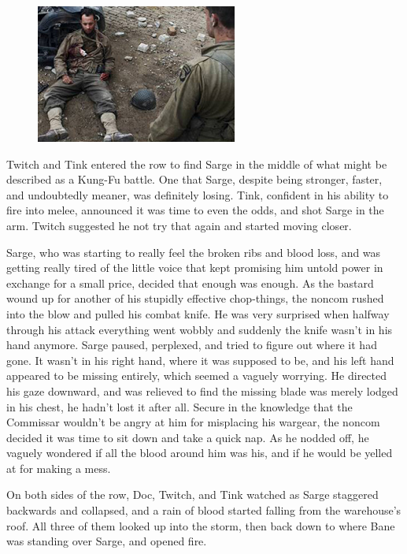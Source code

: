 \begin{figure}
	\begin{center}
		\includegraphics[width=\figwidth]{pics/19/54.png}
	\end{center}
\end{figure}
Twitch and Tink entered the row to find Sarge in the middle of what might be described as a Kung-Fu battle. 
One that Sarge, despite being stronger, faster, and undoubtedly meaner, was definitely losing. 
Tink, confident in his ability to fire into melee, announced it was time to even the odds, and shot Sarge in the arm. 
Twitch suggested he not try that again and started moving closer.

Sarge, who was starting to really feel the broken ribs and blood loss, and was getting really tired of the little voice that kept promising him untold power in exchange for a small price, decided that enough was enough. 
As the bastard wound up for another of his stupidly effective chop-things, the noncom rushed into the blow and pulled his combat knife. 
He was very surprised when halfway through his attack everything went wobbly and suddenly the knife wasn't in his hand anymore. 
Sarge paused, perplexed, and tried to figure out where it had gone. 
It wasn't in his right hand, where it was supposed to be, and his left hand appeared to be missing entirely, which seemed a vaguely worrying. 
He directed his gaze downward, and was relieved to find the missing blade was merely lodged in his chest, he hadn't lost it after all. 
Secure in the knowledge that the Commissar wouldn't be angry at him for misplacing his wargear, the noncom decided it was time to sit down and take a quick nap. 
As he nodded off, he vaguely wondered if all the blood around him was his, and if he would be yelled at for making a mess.

On both sides of the row, Doc, Twitch, and Tink watched as Sarge staggered backwards and collapsed, and a rain of blood started falling from the warehouse's roof. 
All three of them looked up into the storm, then back down to where Bane was standing over Sarge, and opened fire.

